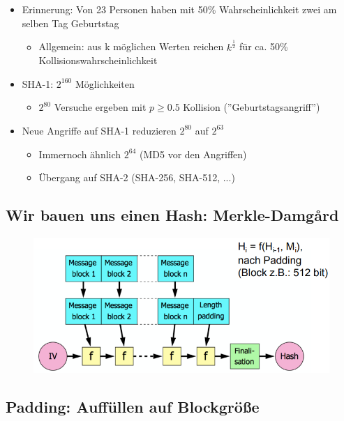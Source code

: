\documentclass[openany]{book}
\begin{document}
\begin{itemize}
    \item Erinnerung: Von 23 Personen haben mit 50\% Wahrscheinlichkeit zwei am selben Tag Geburtstag
    \begin{itemize}
        \item Allgemein: aus k möglichen Werten reichen $k^\frac{1}{2}$ für ca. 50\% Kollisionswahrscheinlichkeit
    \end{itemize}
    \item SHA-1: $2^160$ Möglichkeiten
    \begin{itemize}
        \item $2^80$ Versuche ergeben mit $p\geq 0.5$ Kollision (''Geburtstagsangriff'')
    \end{itemize}
    \item Neue Angriffe auf SHA-1 reduzieren $2^80$ auf $2^63$
    \begin{itemize}
        \item Immernoch ähnlich $2^64$ (MD5 vor den Angriffen)
        \item Übergang auf SHA-2 (SHA-256, SHA-512, ...)
    \end{itemize}
\end{itemize}

\newpage

\subsection{Wir bauen uns einen Hash: Merkle-Damgård}

\begin{figure}[h!]
    \centering
    \includegraphics[width=\linewidth]{Pics/Hashing3.PNG}
\end{figure} 

\subsection{Padding: Auffüllen auf Blockgröße}
\end{document}
